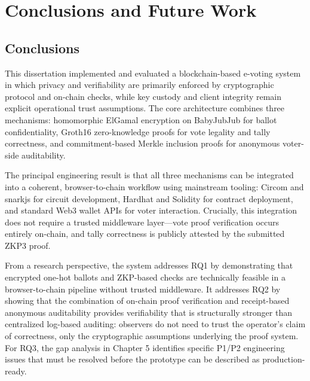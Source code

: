 \chapter{Conclusions and Future Work}

\begingroup
\justifying
\setlength{\parindent}{0pt}
\setlength{\parskip}{0.5\baselineskip}
\titlespacing{\chapter}{0pt}{0pt}{0pt}
\titlespacing{\section}{0pt}{0pt}{0pt}

\section{Conclusions}

This dissertation implemented and evaluated a blockchain-based e-voting system in which privacy and verifiability are primarily enforced by cryptographic protocol and on-chain checks, while key custody and client integrity remain explicit operational trust assumptions. The core architecture combines three mechanisms: homomorphic ElGamal encryption on BabyJubJub for ballot confidentiality, Groth16 zero-knowledge proofs for vote legality and tally correctness, and commitment-based Merkle inclusion proofs for anonymous voter-side auditability.

The principal engineering result is that all three mechanisms can be integrated into a coherent, browser-to-chain workflow using mainstream tooling: Circom and snarkjs for circuit development, Hardhat and Solidity for contract deployment, and standard Web3 wallet APIs for voter interaction. Crucially, this integration does not require a trusted middleware layer---vote proof verification occurs entirely on-chain, and tally correctness is publicly attested by the submitted ZKP3 proof.

From a research perspective, the system addresses RQ1 by demonstrating that encrypted one-hot ballots and ZKP-based checks are technically feasible in a browser-to-chain pipeline without trusted middleware. It addresses RQ2 by showing that the combination of on-chain proof verification and receipt-based anonymous auditability provides verifiability that is structurally stronger than centralized log-based auditing: observers do not need to trust the operator's claim of correctness, only the cryptographic assumptions underlying the proof system. For RQ3, the gap analysis in Chapter 5 identifies specific P1/P2 engineering issues that must be resolved before the prototype can be described as production-ready.

